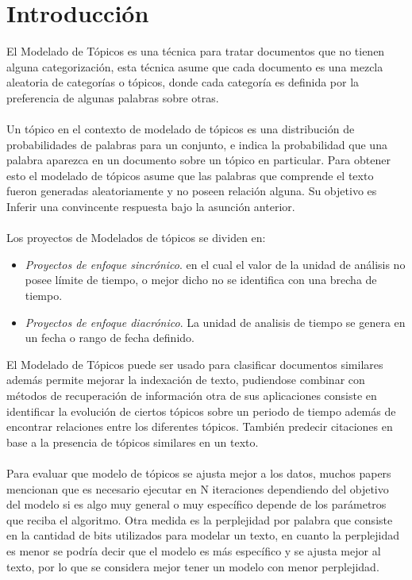 \documentclass[8.5pt,twoside,twocolumn]{article}
\begin{document}
\section{Introducci\'on}
El Modelado de T\'opicos es una t\'ecnica para tratar documentos que no tienen alguna categorizaci\'on, esta t\'ecnica asume que cada documento es una mezcla aleatoria de categor\'ias o t\'opicos, donde cada categor\'ia es definida por la preferencia de algunas palabras sobre otras.
\\
\\
Un t\'opico en el contexto de modelado de t\'opicos es una distribuci\'on
de probabilidades de palabras para un conjunto, e indica la probabilidad
que una palabra aparezca en un documento  sobre un t\'opico en particular. Para obtener esto el modelado de t\'opicos asume que las palabras que comprende el texto fueron generadas aleatoriamente y no poseen relaci\'on alguna. Su objetivo es Inferir una convincente respuesta bajo la asunci\'on anterior.  
\\
\\
Los proyectos de Modelados de t\'opicos se dividen en:
\begin{itemize}
\item \emph{Proyectos de enfoque sincr\'onico}. 
          en el cual el valor de la unidad de an\'alisis no 
          posee l\'imite de tiempo, o mejor dicho no se 
          identifica con una brecha de tiempo.

\item \emph{Proyectos de enfoque diacr\'onico}. 
          La unidad de analisis de tiempo se genera 
          en un fecha o rango de fecha definido.
\end{itemize}
El Modelado de T\'opicos puede ser usado para clasificar documentos similares 
adem\'as permite mejorar la indexaci\'on de texto, pudiendose combinar con m\'etodos de 
recuperaci\'on de informaci\'on otra de sus aplicaciones consiste en identificar la evoluci\'on de ciertos t\'opicos sobre
un periodo de tiempo adem\'as de encontrar relaciones entre los diferentes t\'opicos.
Tambi\'en predecir citaciones en base a la presencia de t\'opicos similares en un texto.
\\ 
\\
Para evaluar que modelo de t\'opicos se ajusta mejor a los datos, muchos papers mencionan que es necesario 
ejecutar en N iteraciones dependiendo del objetivo del modelo si es algo muy general o muy espec\'ifico depende
de los par\'ametros que reciba el algoritmo. Otra medida  es la perplejidad por palabra que consiste
en la cantidad de bits utilizados para modelar un texto, en cuanto la perplejidad es menor se podr\'ia decir que
el modelo es m\'as espec\'ifico y se ajusta mejor al texto, por lo que se considera mejor 
tener un modelo con menor perplejidad.
\end{document}
